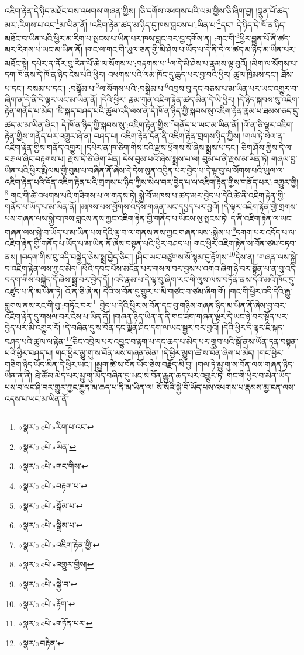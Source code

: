 འཇིག་རྟེན་དེ་ཉིད་མཐོང་བས་འཕགས་གཞན་གྱིས། །ཅི་དགོས་འཕགས་པའི་ལམ་གྱིས་ཅི་ཞིག་བྱ། །བླུན་པོ་ཚད་མར་:རིགས་པ་འང་\footnote{«སྣར་»«པེ་»རིག་པ་འང་}མ་ཡིན་ནོ། །འཇིག་རྟེན་ཚད་མ་ཉིད་དུ་ཁས་བླངས་པ་:ཡིན་པ་\footnote{«སྣར་»«པེ་»ཡིན་}དང་། དེ་ཉིད་དེ་ཁོ་ན་ཉིད་མཐོང་བ་ཡིན་པའི་ཕྱིར་མ་རིག་པ་སྤངས་པ་ཡིན་པར་ཁས་བླང་བར་བྱ་དགོས་ན། :གང་གི་\footnote{«སྣར་»«པེ་»གང་གིས་}ཕྱིར་བླུན་པོ་ནི་ཚད་མར་རིགས་པ་ཡང་མ་ཡིན་ནོ། །གང་ལ་གང་གི་ཡུལ་ཅན་གྱི་མི་ཤེས་པ་ཡོད་པ་དེ་ནི་དེ་ལ་ཚད་མ་ཉིད་མ་ཡིན་པར་མཐོང་སྟེ། དཔེར་ན་ནོར་བུ་རིན་པོ་ཆེ་ལ་སོགས་པ་:བརྟགས་པ་\footnote{«སྣར་»«པེ་»བརྟག་པ་}ལ་དེ་མི་ཤེས་པ་རྣམས་ལྟ་བུའོ། །མིག་ལ་སོགས་པ་དག་ཁོ་ནས་དེ་ཁོ་ན་ཉིད་ངེས་པའི་ཕྱིར། འཕགས་པའི་ལམ་ཁོང་དུ་ཆུད་པར་བྱ་བའི་ཕྱིར། ཚུལ་ཁྲིམས་དང་། ཐོས་པ་དང་། བསམ་པ་དང་། :བསྒོམ་པ་\footnote{«སྣར་»«པེ་»སྒོམ་པ་}ལ་སོགས་པའི་:བསྒྲིམ་པ་\footnote{«སྣར་»«པེ་»སྒྲིམ་པ་}འབྲས་བུ་དང་བཅས་པ་མ་ཡིན་པར་ཡང་འགྱུར་བ་ཞིག་ན་དེ་ནི་དེ་ལྟར་ཡང་མ་ཡིན་ནོ། །དེའི་ཕྱིར། རྣམ་ཀུན་འཇིག་རྟེན་ཚད་མིན་དེ་ཡི་ཕྱིར། །དེ་ཉིད་སྐབས་སུ་འཇིག་རྟེན་གནོད་པ་མེད། །ཇི་སྐད་བཤད་པའི་ཚུལ་འདི་ལས་ན་དེ་ཁོ་ན་ཉིད་ཀྱི་སྐབས་སུ་འཇིག་རྟེན་རྣམ་པ་ཐམས་ཅད་དུ་ཚད་མ་མ་ཡིན་ཞིང་། དེ་ཁོ་ན་ཉིད་ཀྱི་སྐབས་སུ་:འཇིག་རྟེན་གྱིས་\footnote{«སྣར་»«པེ་»འཇིག་རྟེན་གྱི་}གནོད་པ་ཡང་མ་ཡིན་ནོ། །འོ་ན་ཅི་ལྟར་འཇིག་རྟེན་གྱིས་གནོད་པར་འགྱུར་ཞེ་ན། བཤད་པ། འཇིག་རྟེན་དོན་ནི་འཇིག་རྟེན་གྲགས་ཉིད་ཀྱིས། །གལ་ཏེ་སེལ་ན་འཇིག་རྟེན་གྱིས་གནོད་འགྱུར། །དཔེར་ན་ཁ་ཅིག་གིས་ངའི་རྫས་ཕྲོགས་སོ་ཞེས་སྨྲས་པ་དང་། ཅིག་ཤོས་ཀྱིས་དེ་ལ་བརྒལ་ཞིང་བརྟགས་པ། རྫས་དེ་ཅི་ཞིག་ཡིན། དེས་བུམ་པའོ་ཞེས་སྨྲས་པ་ལ། བུམ་པ་ནི་རྫས་མ་ཡིན་ཏེ། གཞལ་བྱ་ཡིན་པའི་ཕྱིར་རྨི་ལམ་གྱི་བུམ་པ་བཞིན་ནོ་ཞེས་དེ་དེས་སུན་འབྱིན་པར་བྱེད་པ་དེ་ལྟ་བུ་ལ་སོགས་པའི་ཡུལ་ལ་འཇིག་རྟེན་པའི་དོན་འཇིག་རྟེན་པའི་གྲགས་པ་ཉིད་ཀྱིས་སེལ་བར་བྱེད་པ་ལ་འཇིག་རྟེན་གྱིས་གནོད་པར་:འགྱུར་གྱི།\footnote{«སྣར་»«པེ་»འགྱུར་གྱིས།} གང་གི་ཚེ་འཕགས་པའི་གཟིགས་པ་ལ་གནས་ཏེ། སྐྱེ་བོ་མཁས་པ་ཚད་མར་བྱེད་པ་དེའི་ཚེ་ནི་འཇིག་རྟེན་གྱི་གནོད་པ་ཡོད་པ་མ་ཡིན་ནོ། །མཁས་པས་ཕྱོགས་འདིས་གཞན་ཡང་དཔྱད་པར་བྱའོ། །དེ་ལྟར་འཇིག་རྟེན་གྱི་གྲགས་པས་གཞན་ལས་སྐྱེ་བ་ཁས་བླངས་ནས་ཀྱང་འཇིག་རྟེན་གྱི་གནོད་པ་ཡོངས་སུ་སྤངས་ཏེ། ད་ནི་འཇིག་རྟེན་ལ་ཡང་གཞན་ལས་སྐྱེ་བ་ཡོད་པ་མ་ཡིན་པས་དེའི་ལྟ་བ་ལ་གནས་ནས་ཀྱང་གཞན་ལས་:སྐྱེས་པ་\footnote{«སྣར་»«པེ་»སྐྱེ་བ་}དགག་པར་འདོད་པ་ལ་འཇིག་རྟེན་གྱི་གནོད་པ་ཡོད་པ་མ་ཡིན་ནོ་ཞེས་བསྟན་པའི་ཕྱིར་བཤད་པ། གང་ཕྱིར་འཇིག་རྟེན་ས་བོན་ཙམ་བཏབ་ནས། །བདག་གིས་བུ་འདི་བསྐྱེད་ཅེས་སྨྲ་བྱེད་ཅིང་། །ཤིང་ཡང་བཙུགས་སོ་སྙམ་དུ་རྟོགས་\footnote{«སྣར་»«པེ་»རྟོག་}དེས་ན། །གཞན་ལས་སྐྱེ་བ་འཇིག་རྟེན་ལས་ཀྱང་མེད། །ཕོའི་དབང་པོས་མངོན་པར་གསལ་བར་བྱས་པ་འགའ་ཞིག་ཉེ་བར་སྟོན་པ་ན་བུ་འདི་བདག་གིས་བསྐྱེད་དོ་ཞེས་སྨྲ་བར་བྱེད་དོ། །འདི་རྣམ་པ་དེ་ལྟ་བུ་ཞིག་རང་གི་ལུས་ལས་བཏོན་ནས་དེའི་མའི་ཁོང་དུ་འཛུད་པ་ནི་མ་ཡིན་ཏེ། འོ་ན་ཅི་ཞེ་ན། དེའི་ས་བོན་དུ་གྱུར་པ་མི་གཙང་བ་ཙམ་ཞིག་གོ། །གང་གི་ཕྱིར་འདི་དེའི་རྒྱུ་བླུགས་ནས་རང་གི་བུ་:གཏོང་བར་\footnote{«སྣར་»«པེ་»གཏོན་པར་}བྱེད་པ་དེའི་ཕྱིར་ས་བོན་དང་བུ་གཉིས་གཞན་ཉིད་མ་ཡིན་ནོ་ཞེས་བྱ་བར་འཇིག་རྟེན་དུ་གསལ་བར་ངེས་པ་ཡིན་ནོ། །གཞན་ཉིད་ཡིན་ན་ནི་གང་ཟག་གཞན་ལྟར་དེ་ཡང་ཉེ་བར་སྟོན་པར་བྱེད་པར་མི་འགྱུར་རོ། །དེ་བཞིན་དུ་ས་བོན་དང་ལྗོན་ཤིང་དག་ལ་ཡང་སྦྱར་བར་བྱའོ། །དེའི་ཕྱིར་དེ་ལྟར་ཇི་སྐད་བཤད་པའི་ཚུལ་ལ་རྟེན་\footnote{«སྣར་»བརྟེན་}ཅིང་འབྲེལ་པར་འབྱུང་བ་རྟག་པ་དང་ཆད་པ་མེད་པར་གྲུབ་པའི་སྒོ་ནས་ཡོན་ཏན་བསྟན་པའི་ཕྱིར་བཤད་པ། གང་ཕྱིར་མྱུ་གུ་ས་བོན་ལས་གཞན་མིན། །དེ་ཕྱིར་མྱུག་ཚེ་ས་བོན་ཞིག་པ་མེད། །གང་ཕྱིར་གཅིག་ཉིད་ཡོད་མིན་དེ་ཕྱིར་ཡང་། །མྱུག་ཚེ་ས་བོན་ཡོད་ཅེས་བརྗོད་མི་བྱ། །གལ་ཏེ་མྱུ་གུ་ས་བོན་ལས་གཞན་ཉིད་ཡིན་ན་ནི། ཐེ་ཚོམ་མེད་པར་མྱུ་གུ་ཡོད་བཞིན་དུ་ཡང་ས་བོན་རྒྱུན་ཆད་པར་འགྱུར་ཏེ། གང་གི་ཕྱིར་བ་མེན་ཡོད་པས་བ་ལང་ཤི་བར་གྱུར་ཀྱང་རྒྱུན་མ་ཆད་པ་ནི་མ་ཡིན་ལ། སོ་སོའི་སྐྱེ་བོ་ཡོད་པས་འཕགས་པ་རྣམས་མྱ་ངན་ལས་འདས་པ་ཡང་མ་ཡིན་ནོ། 